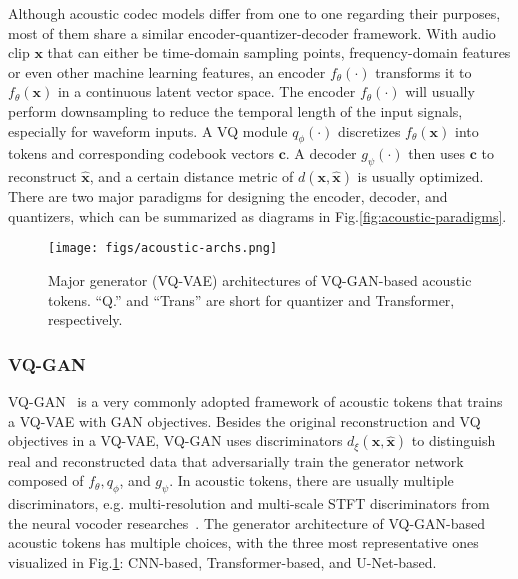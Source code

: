 Although acoustic codec models differ from one to one regarding their purposes, most of them share a similar encoder-quantizer-decoder framework.
With audio clip $\bm x$ that can either be time-domain sampling points, frequency-domain features or even other machine learning features, an encoder $f_\theta(\cdot)$ transforms it to $f_\theta(\bm x)$ in a continuous latent vector space. 
The encoder $f_\theta(\cdot)$ will usually perform downsampling to reduce the temporal length of the input signals, especially for waveform inputs.
A VQ module $q_\phi(\cdot)$ discretizes $f_\theta(\bm x)$ into tokens and corresponding codebook vectors $\bm c$.
A decoder $g_\psi(\cdot)$ then uses $\bm c$ to reconstruct $\hat {\bm x}$, and a certain distance metric of $d(\bm x, \hat{\bm x})$ is usually optimized.
There are two major paradigms for designing the encoder, decoder, and quantizers, which can be summarized as diagrams in Fig.\ref{fig:acoustic-paradigms}.

\begin{figure}
    \centering
    \texttt{[image: figs/acoustic-archs.png]}
    \caption{Major generator (VQ-VAE) architectures of VQ-GAN-based acoustic tokens. 
    ``Q.'' and ``Trans'' are short for quantizer and Transformer, respectively.}
    \label{fig:generator}
    \vspace{-0.2in}
\end{figure}

\subsubsection{VQ-GAN}
VQ-GAN~\cite{esser2021taming} is a very commonly adopted framework of acoustic tokens that trains a VQ-VAE with GAN objectives. 
Besides the original reconstruction and VQ objectives in a VQ-VAE, VQ-GAN uses discriminators $d_\xi(\bm x, \hat{\bm x})$ to distinguish real and reconstructed data that adversarially train the generator network composed of $f_\theta,q_\phi$, and $g_\psi$. In acoustic tokens, there are usually multiple discriminators, e.g. multi-resolution and multi-scale STFT discriminators from the neural vocoder researches~\cite{kumar2019melgan,jang21_interspeech}.
The generator architecture of VQ-GAN-based acoustic tokens has multiple choices, with the three most representative ones visualized in Fig.\ref{fig:generator}: CNN-based, Transformer-based, and U-Net-based.

